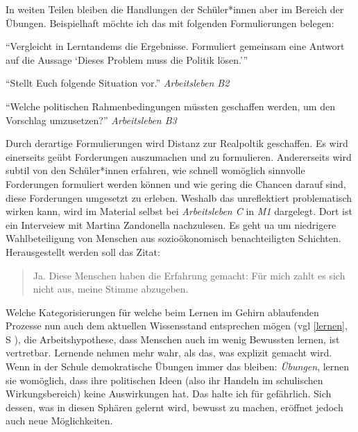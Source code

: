 In weiten Teilen bleiben die Handlungen der Schüler*innen aber im Bereich der Übungen. Beispielhaft möchte ich das mit folgenden Formulierungen belegen:
\begin{myitemize}
    \item \enquote{Vergleicht in Lerntandems die Ergebnisse. Formuliert gemeinsam eine Antwort auf die Aussage \enquote{Dieses Problem muss die Politik lösen.}}

    \item \enquote{Stellt Euch folgende Situation vor.} \emph{Arbeitsleben B2}

    \item \enquote{Welche politischen Rahmenbedingungen müssten geschaffen werden, um den Vorschlag umzusetzen?} \emph{Arbeitsleben B3}
\end{myitemize}
Durch derartige Formulierungen wird Distanz zur Realpoltik geschaffen. Es wird einerseits geübt Forderungen auszumachen und zu formulieren. Andererseits wird subtil von den Schüler*innen erfahren, wie schnell womöglich sinnvolle Forderungen formuliert werden können und wie gering die Chancen darauf sind, diese Forderungen umgesetzt zu erleben. 
Weshalb das unreflektiert problematisch wirken kann, wird im Material selbst bei \emph{Arbeitsleben C} in \emph{M1} dargelegt. Dort ist ein Interveiew mit Martina Zandonella \autocite{Zandonella.2024} nachzulesen. Es geht \gls{ua} um niedrigere Wahlbeteiligung von Menschen aus sozioökonomisch benachteiligten Schichten. Herausgestellt werden soll das Zitat:
\begin{quote}
    Ja. Diese Menschen haben die Erfahrung gemacht: Für mich zahlt es sich nicht aus, meine Stimme abzugeben.   
\end{quote}
Welche Kategorisierungen für welche beim Lernen im Gehirn ablaufenden Prozesse nun auch dem aktuellen Wissensstand entsprechen mögen (\gls{vgl} \ref{lernen}, \gls{S} \pageref{lernen}), die Arbeitshypothese, dass Menschen auch im wenig Bewussten lernen, ist vertretbar. 
Lernende nehmen mehr wahr, als das, was explizit gemacht wird. Wenn in der Schule demokratische Übungen immer das bleiben: \emph{Übungen}, lernen sie womöglich, dass ihre politischen Ideen (also ihr Handeln im schulischen Wirkungsbereich) keine Auswirkungen hat. Das halte ich für gefährlich. 
Sich dessen, was in diesen Sphären gelernt wird, bewusst zu machen, eröffnet jedoch auch neue Möglichkeiten. 


